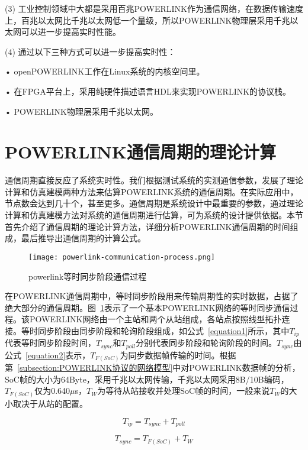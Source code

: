 (3) 工业控制领域中大都是采用百兆POWERLINK作为通信网络，在数据传输速度上，百兆以太网比千兆以太网低一个量级，所以POWERLINK物理层采用千兆以太网可以进一步提高实时性能。

(4) 通过以下三种方式可以进一步提高实时性：

        • openPOWERLINK工作在Linux系统的内核空间里。
        
        • 在FPGA平台上，采用纯硬件描述语言HDL来实现POWERLINK的协议栈。
        
        • POWERLINK物理层采用千兆以太网。

\section{POWERLINK通信周期的理论计算}
\label{section:理论计算POWERLINK通信周期}
通信周期直接反应了系统实时性。我们根据测试系统的实测通信参数，发展了理论计算和仿真建模两种方法来估算POWERLINK系统的通信周期。在实际应用中，节点数会达到几十个，甚至更多。通信周期是系统设计中最重要的参数，通过理论计算和仿真建模方法对系统的通信周期进行估算，可为系统的设计提供依据。本节首先介绍了通信周期的理论计算方法，详细分析POWERLINK通信周期的时间组成，最后推导出通信周期的计算公式\cite{Knezic2017}。

\begin{figure}[!htb]
  \centering
  \texttt{[image: powerlink-communication-process.png]}
  \caption{powerlink等时同步阶段通信过程}
  \label{fig:powerlink-communication-process}
\end{figure}

在POWERLINK通信周期中，等时同步阶段用来传输周期性的实时数据，占据了绝大部分的通信周期。图~\ref{fig:powerlink-communication-process}表示了一个基本POWERLINK网络的等时同步通信过程。该POWERLINK网络由一个主站和两个从站组成，各站点按照线型拓扑连接。等时同步阶段由同步阶段和轮询阶段组成，如公式~\ref{equation1}所示，其中$T_{ip}$代表等时同步阶段时间，$T_{sync}$和$T_{poll}$分别代表同步阶段和轮询阶段的时间。$T_{sync}$由公式~\ref{equation2}表示，$T_{F(SoC)}$为同步数据帧传输的时间。根据第~\ref{subsection:POWERLINK协议的网络模型}中对POWERLINK数据帧的分析，SoC帧的大小为64Byte，采用千兆以太网传输，千兆以太网采用8B/10B编码，$T_{F(SoC)}$仅为0.640$\mu$s，$T_{W}$为等待从站接收并处理SoC帧的时间，一般来说$T_{W}$的大小取决于从站的配置。

\begin{equation}
\label{equation1}
T_{ip}=T_{sync}+T_{poll}
\end{equation}

\begin{equation}
\label{equation2}
T_{sync}=T_{F(SoC)}+T_{W}
\end{equation}

